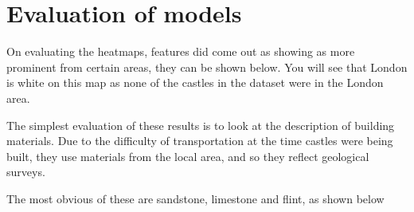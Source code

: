 \documentclass[11pt]{article}
\begin{document}
\section{Evaluation of models}

On evaluating the heatmaps, features did come out as showing as more prominent from certain areas, they can be shown below. You will see that London is white on this map as none of the castles in the dataset were in the London area.

The simplest evaluation of these results is to look at the description of building materials. Due to the difficulty of transportation at the time castles were being built, they use materials from the local area, and so they reflect geological surveys.

The most obvious of these are sandstone, limestone and flint, as shown below
\end{document}
